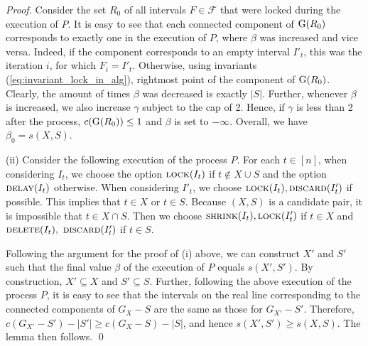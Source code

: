 \begin{proof}
Consider the set $R_0$ of all intervals $F \in \mathcal{F}$ that were locked during the execution of $P$. 
It is easy to see that each connected component of $\operatorname{G}(R_0)$ corresponds to exactly one  in the execution of $P$, where $\beta$ was increased and vice versa. 
Indeed, if the component corresponds to an empty interval $I'_t$, this  was the iteration $i$, for which $F_i = I'_t$.
Otherwise, using invariants (\ref{eq:invariant_lock_in_alg}),  rightmost point of the component of $\operatorname{G}(R_0)$. 
Clearly, the amount of times $\beta$ was decreased is exactly $|S|$.
Further, whenever $\beta$ is increased, we also increase $\gamma$ subject to the cap of 2.
Hence, if $\gamma$ is less than 2 after the process, $c(\operatorname{G}(R_0)) \leq  1$ and $\beta$ is set to $-\infty$. 
Overall, we have $\beta_0 = s(X, S)$. 

(ii) Consider the following execution of the process $P$.
For each $t \in [n]$, when considering $I_t$, we choose the option $\textsc{lock}(I_t)$ if $t \notin X \cup S$ and the option  $\textsc{delay}(I_t)$ otherwise.
When considering $I'_t$, we choose $\textsc{lock}(I_t), \textsc{discard}(I'_t)$ if possible.
   This implies that $t \in X$ or $t \in S$.
Because $(X,S)$ is a candidate pair, it is impossible that $t \in X \cap S$.
Then we choose $\textsc{shrink}(I_t), \textsc{lock}(I'_t)$ if $t \in X$ and $\textsc{delete}(I_t),$ $\textsc{discard}(I'_t)$ if $t \in S$.

Following the argument for the proof of (i) above, we can construct $X'$ and $S'$ such that the final value $\beta$ of the execution of $P$ equals $s(X',S')$. 
By construction, $X' \subseteq X$ and $S' \subseteq S$.
Further, following the above execution of the process $P$, it is easy to see that the intervals on the real line corresponding to the connected components of $G_X - S$ are the same as those for $G_{X'} - S'$.
Therefore, $c(G_{X'} - S') - |S'| \geq c(G_{X} - S) - |S|$, and hence $s(X',S') \geq s(X,S)$.
The lemma then follows.
\qed
\end{proof}

